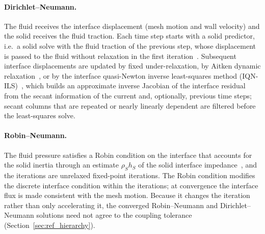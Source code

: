 \paragraph{Dirichlet--Neumann.}
The fluid receives the interface displacement (mesh motion and wall velocity) and the solid receives the fluid traction.
Each time step starts with a solid predictor, i.e.\ a solid solve with the fluid traction of the previous step, whose displacement is passed to the fluid without relaxation in the first iteration~\citep{Tukovic2018}.
Subsequent interface displacements are updated by fixed under-relaxation, by Aitken dynamic relaxation~\citep{kuttler2008fixed}, or by the interface quasi-Newton inverse least-squares method (IQN-ILS)~\citep{Degroote2009}, which builds an approximate inverse Jacobian of the interface residual from the secant information of the current and, optionally, previous time steps; secant columns that are repeated or nearly linearly dependent are filtered before the least-squares solve.

\paragraph{Robin--Neumann.}
The fluid pressure satisfies a Robin condition on the interface that accounts for the solid inertia through an estimate $\rho_S h_S$ of the solid interface impedance~\citep{Tukovic2018b}, and the iterations are unrelaxed fixed-point iterations.
The Robin condition modifies the discrete interface condition within the iterations; at convergence the interface flux is made consistent with the mesh motion.
Because it changes the iteration rather than only accelerating it, the converged Robin--Neumann and Dirichlet--Neumann solutions need not agree to the coupling tolerance (Section~\ref{sec:ref_hierarchy}).

